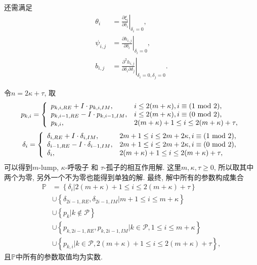 \documentclass{article}
\newcommand{\bbrace}[1]{\left\{#1\right\}}
\newcommand{\eval}[2]{\left.{#1}\right|_{#2}}
\newcommand{\PS}{\mathcal{P}}
\newcommand{\DIFF}[2]{\ensuremath{\frac{\partial #1}{\partial #2}}}
\renewcommand{\mod}{{\rm ~mod~}}
\begin{document}
还需满足 
\begin{equation}
\begin{aligned} 
\theta_i &= \eval{\DIFF{\xi_i}{\delta_i}}{\delta_i=0} ,\\ 
\psi_{i,j} &= \eval{\DIFF{h_{i,j}}{\delta_i}}{\delta_i=0} ,\\ 
b_{i,j} &= \eval{\frac{\partial^2 h_{i,j}}{\partial \delta_i \partial \delta_j}}{\delta_i=0,\delta_j=0} .
\end{aligned}
\end{equation}

令$n=2\kappa+\tau$, 取
\begin{equation}
p_{k,i}=\left\{
\begin{array}{ll}
  p_{k,i,RE}+I\cdot p_{k,i,IM}, & i\le 2(m+\kappa), i\equiv(1 \mod 2),\\
  p_{k,i-1,RE}-I\cdot p_{k,i-1,IM}, & i\le 2(m+\kappa), i\equiv(0 \mod 2),\\
  p_{k,i}, & 2(m+\kappa)+1 \le i \le 2(m+\kappa)+\tau ,
\end{array}
\right.
\end{equation}
\begin{equation}
\delta_i=\left\{\begin{array}{ll}
  \delta_{i,RE}+I\cdot\delta_{i,IM}, & 2m+1\le i \le 2m+2\kappa, i\equiv(1 \mod 2), \\ 
  \delta_{i-1,RE}-I\cdot\delta_{i-1,IM}, & 2m+1\le i \le 2m+2\kappa, i\equiv(0 \mod 2) ,\\
  \delta_i, & 2(m+\kappa)+1 \le i \le 2(m+\kappa)+\tau ,
\end{array}\right.
\end{equation}
可以得到$m$-lump, $\kappa$-呼吸子 和 $\tau$-孤子的相互作用解. 这里$m,\kappa,\tau\ge 0$, 所以取其中两个为零, 另外一个不为零也能得到单独的解. 最终, 解中所有的参数构成集合
\begin{equation}
\begin{aligned}
\mathbb{P}
&=\bbrace{\delta_i|2(m+\kappa)+1 \le i \le 2(m+\kappa)+\tau}  \\
&\cup\bbrace{\delta_{2i-1,RE},\delta_{2i-1,IM}|m+1\le i \le m+\kappa} \\ 
&\cup\bbrace{p_k|k\not\in \PS} \\
&\cup\bbrace{p_{k,2i-1,RE},p_{k,2i-1,IM}|k\in\PS,1\le i \le m+\kappa} \\
&\cup\bbrace{p_{k,i}|k\in\PS,2(m+\kappa)+1 \le i \le 2(m+\kappa)+\tau},
\end{aligned}
\end{equation}
且$\mathbb P$中所有的参数取值均为实数. 
\end{document}
